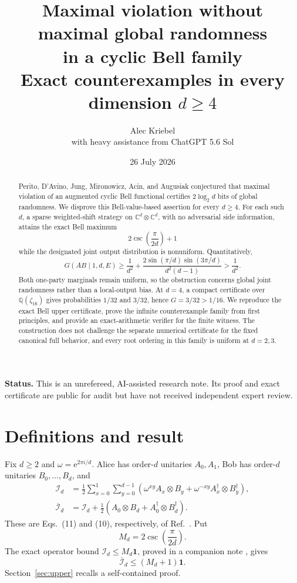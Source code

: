 \documentclass[11pt]{article}
\title{\vspace{-1.4cm}\textbf{Maximal violation without maximal global randomness}\\[0.25em]
\textbf{in a cyclic Bell family}\\[0.45em]
\large Exact counterexamples in every dimension \(d\geq4\)}
\author{Alec Kriebel\\
\small with heavy assistance from ChatGPT 5.6 Sol}
\date{26 July 2026}
\theoremstyle{remark}
\newcommand{\Id}{\mathbf 1}
\newcommand{\cI}{\mathcal I}
\newcommand{\e}{\mathrm e}
\newcommand{\bbC}{\mathbb C}
\begin{document}
\maketitle

\begin{abstract}
Perito, D'Avino, Jung, Mironowicz, Acin, and Augusiak conjectured that
maximal violation of an augmented cyclic Bell functional certifies
\(2\log_2d\) bits of global randomness.  We disprove this Bell-value-based
assertion for every \(d\geq4\).  For each such \(d\), a
sparse weighted-shift strategy on
\(\bbC^d\otimes\bbC^d\), with no adversarial side information, attains the
exact Bell maximum
\[
  2\csc\!\left(\frac{\pi}{2d}\right)+1
\]
while the designated joint output distribution is nonuniform.  Quantitatively,
\[
  G(AB\mid1,d,E)
  \geq\frac1{d^2}
  +\frac{2\sin(\pi/d)\sin(3\pi/d)}{d^2(d-1)}
  >\frac1{d^2}.
\]
Both one-party marginals remain uniform, so the obstruction concerns global
joint randomness rather than a local-output bias.  At \(d=4\), a compact
certificate over \(\mathbb Q(\zeta_{16})\) gives probabilities \(1/32\) and
\(3/32\), hence \(G=3/32>1/16\).  We reproduce the exact Bell upper
certificate, prove the infinite counterexample family from first principles,
and provide an exact-arithmetic verifier for the finite witness.  The
construction does not challenge the separate numerical certificate for the
fixed canonical full behavior, and every root ordering in this family is
uniform at \(d=2,3\).
\end{abstract}

\medskip
\noindent\textbf{Status.}
This is an unrefereed, AI-assisted research note.  Its proof and exact
certificate are public for audit but have not received independent expert
review.

\section{Definitions and result}

Fix \(d\geq2\) and \(\omega=\e^{2\pi i/d}\).  Alice has order-\(d\)
unitaries \(A_0,A_1\), Bob has order-\(d\) unitaries
\(B_0,\ldots,B_d\), and
\begin{align}
  \cI_d
  &=
  \frac12\sum_{x=0}^{1}\sum_{y=0}^{d-1}
  \left(
    \omega^{xy}A_x\otimes B_y+
    \omega^{-xy}A_x^\dagger\otimes B_y^\dagger
  \right),\label{eq:I}\\
  \overline{\cI}_d
  &=
  \cI_d+
  \frac12\left(
    A_0\otimes B_d+A_0^\dagger\otimes B_d^\dagger
  \right).\label{eq:Ibar}
\end{align}
These are Eqs.~(11) and (10), respectively, of
Ref.~\cite{PeritoEtAl2026}.  Put
\begin{equation}
  M_d=2\csc\!\left(\frac{\pi}{2d}\right).
  \label{eq:Md}
\end{equation}
The exact operator bound
\(\cI_d\leq M_d\Id\), proved in a companion note
\cite{KriebelBound2026}, gives
\begin{equation}
  \overline{\cI}_d\leq(M_d+1)\Id.
  \label{eq:bar-bound}
\end{equation}
Section~\ref{sec:upper} recalls a self-contained proof.
\end{document}
